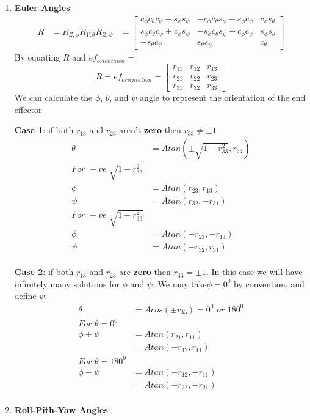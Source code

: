 \documentclass[12pt,a4paper]{article}
\begin{document}
\begin{enumerate}
\item \textbf{Euler Angles}:
\begin{align*}
R &= R_{Z,\phi}R_{Y,\theta}R_{Z,\psi}
&= \begin{bmatrix}
c_{\phi}c_{\theta}c_{\psi} -  s_{\phi}s_{\psi} & - c_{\phi}c_{\theta}s_{\psi} -  s_{\phi}c_{\psi} & c_{\phi}s_{\theta} \\
s_{\phi}c_{\theta}c_{\psi} + c_{\phi}s_{\psi} & - s_{\phi}c_{\theta}s_{\psi} + c_{\phi}c_{\psi} & s_{\phi}s_{\theta} \\
- s_{\theta}c_{\psi} &  s_{\theta}s_{\psi} & c_{\theta}
\end{bmatrix}
\end{align*}
By equating $R$ and $ef_{orientaion} = $ \\
$$R = ef_{orientation}=\begin{bmatrix}
r_{11} & r_{12} & r_{13} \\
	r_{21} & r_{22} & r_{23} \\
	r_{31} & r_{32} & r_{33}
\end{bmatrix}$$
We can calculate the $\phi$, $\theta$, and $\psi$ angle to represent the orientation of the end effector

\textbf{Case 1}: if both $r_{13}$ and $r_{23}$ aren't \textbf{zero} then $r_{33} \neq \pm 1$
\begin{align*}
\theta &= Atan(\pm\sqrt{1-r^2_{33}}, r_{33}) \\
	For\,\,+ve\,\, \sqrt{1-r^2_{33}} \\
	\phi &= Atan(r_{23}, r_{13}) \\
	\psi &= Atan(r_{32}, -r_{31}) \\
	For\,\,-ve\,\, \sqrt{1-r^2_{33}} \\
	\phi &= Atan(-r_{23}, -r_{13}) \\
	\psi &= Atan(-r_{32}, r_{31}) \\
\end{align*}

\textbf{Case 2}: if both $r_{13}$ and $r_{23}$ are \textbf{zero} then $r_{33} = \pm 1$. In this case we will have infinitely many solutions for $\phi$ and $\psi$. We may take$\phi = 0^0$ by convention, and define $\psi$.
\begin{align*}
\theta &= Acos(\pm r_{33}) = 0^0\,\, or\,\, 180^0\\
	For\,\, \theta = 0^0 \\
	\phi +\psi &= Atan(r_{21}, r_{11}) \\
	&= Atan(-r_{12}, r_{11}) \\
	For\,\, \theta = 180^0 \\
	\phi -\psi &= Atan(-r_{12}, -r_{11}) \\
	&= Atan(-r_{22}, -r_{21}) \\
\end{align*}

\item \textbf{Roll-Pith-Yaw Angles}:
\end{enumerate}
\end{document}
